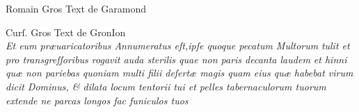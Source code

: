 \documentclass{article}
\begin{document}
\vspace{-3\baselineskip}
\begin{multicols}{2}
	\tiny
	\centering
	Romain Gros Text de Garamond\\
	\vspace{0.5\baselineskip}
	\small
	\justifying
	\noindent {}

	\columnbreak
	\tiny
	\centering
	Curſ. Gros Text de GronIon\\
	\vspace{0.5\baselineskip}
	\small
	\justifying
	\noindent
	\textit{Et eum pr\ae{}uaricatoribus Annumeratus eſt,ipſe quoque pecatum Multorum\linebreak}
	\textit{tulit et pro transgreſſoribus rogavit auda sterilis quae non paris decanta laudem et hinni qu\ae{} non pariebas quoniam multi filii deſert\ae{} magis quam eius qu\ae{} habebat virum dicit Dominus, \& dilata locum tentorii tui et pelles tabernaculorum tuorum extende ne parcas longos fac funiculos tuos\\}
\end{multicols}
\end{document}
